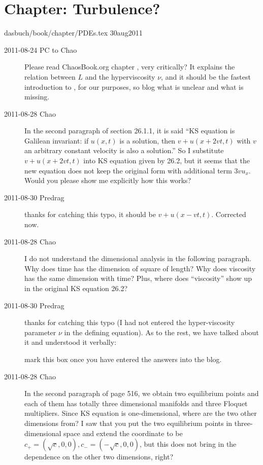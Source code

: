 \section{Chapter: Turbulence?}
\noindent dasbuch/book/chapter/PDEs.tex 30aug2011
\begin{description}


\item[2011-08-24 PC to Chao] Please read ChaosBook.org chapter
, very
critically? It explains the relation between $L$ and the hyperviscosity
$\nu$, and it should be the fastest introduction to \KSe, for our
purposes, so blog what is unclear and what is missing.

\item[2011-08-28 Chao]

In the second paragraph of section 26.1.1, it is said ``KS equation is
Galilean invariant: if $u(x,t)$ is a solution, then $v+u(x+2vt,t)$ with
$v$ an arbitrary constant velocity is also a solution.'' So I substitute
$v+u(x+2vt,t)$ into KS equation given by 26.2, but it seems that the new
equation does not keep the original form with additional term $3vu_x$.
Would you please show me explicitly how this works?

\item[2011-08-30 Predrag] thanks for catching this typo, it should be
$v+u(x-vt,t)$. Corrected now.

\item[2011-08-28 Chao]
I do not understand the dimensional analysis in the following
paragraph. Why does time has the dimension of square of length? Why does
viscosity has the same dimension with time? Plus, where does
``viscosity'' show up in the original KS equation 26.2?

\item[2011-08-30 Predrag] thanks for catching this typo (I had not
entered the hyper-viscosity parameter $\nu$ in the defining equation).
As to the rest, we have talked about it and understood it verbally:

 mark this box once you have entered the
answers into the blog.

\item[2011-08-28 Chao]
In the second paragraph of page 516, we obtain two equilibrium points and
each of them has totally three dimensional manifolds and three Floquet
multipliers. Since KS equation is one-dimensional, where are the two
other dimensions from? I saw that you put the two equilibrium points in
three-dimensional space and extend the coordinate to be $c_+ =
(\sqrt{c},0,0),c_- = (-\sqrt{c},0,0)$, but this does not bring in the
dependence on the other two dimensions, right?


\end{description}
